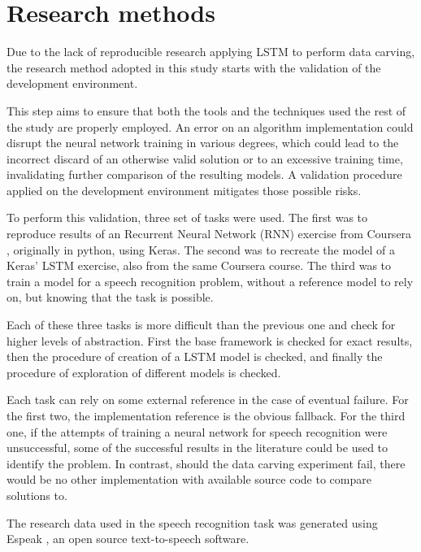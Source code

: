 \section{Research methods}


Due to the lack of reproducible research applying LSTM to perform data carving, the research method adopted in this study starts with the validation of the development environment. 

This step aims to ensure that both the tools and the techniques used the rest of the study are properly employed. An error on an algorithm implementation could disrupt the neural network training in various degrees, which could lead to the incorrect discard of an otherwise valid solution or to an excessive training time, invalidating further comparison of the resulting models. A validation procedure applied on the development environment mitigates those possible risks. 

To perform this validation, three set of tasks were used. The first was to reproduce results of an Recurrent Neural Network (RNN) exercise from Coursera , originally in python, using Keras. The second was to recreate the model of a Keras' LSTM exercise, also from the same Coursera course. The third was to train a model for a speech recognition problem, without a reference model to rely on, but knowing that the task is possible. 

Each of these three tasks is more difficult than the previous one and check for higher levels of abstraction. First the base framework is checked for exact results, then the procedure of creation of a LSTM model is checked, and finally the procedure of exploration of different models is checked.

Each task can rely on some external reference in the case of eventual failure. For the first two, the implementation reference is the obvious fallback. For the third one, if the attempts of training a neural network for speech recognition were unsuccessful, some of the successful results in the literature could be used to identify the problem. In contrast, should the data carving experiment fail, there would be no other implementation with available source code to compare solutions to.


The research data used in the speech recognition task was generated using Espeak , an open source text-to-speech software. 

